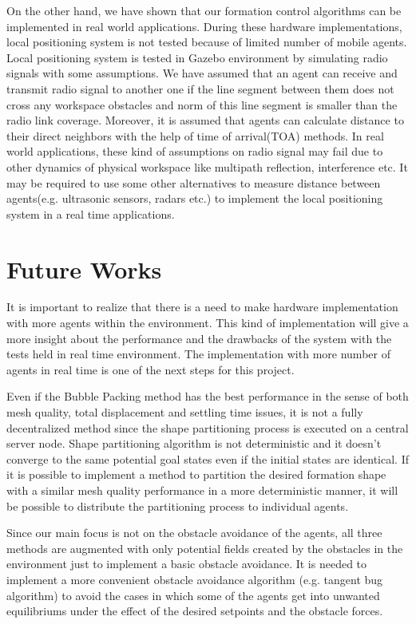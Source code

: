 On the other hand, we have shown that our formation control algorithms can be implemented in real world applications. During these hardware implementations, local positioning system is not tested because of limited number of mobile agents. Local positioning system is tested in Gazebo environment by simulating radio signals with some assumptions. We have assumed that an agent can receive and transmit radio signal to another one if the line segment between them does not cross any workspace obstacles and norm of this line segment is smaller than the radio link coverage. Moreover, it is assumed that agents can calculate distance to their direct neighbors with the help of time of arrival(TOA) methods. In real world applications, these kind of assumptions on radio signal may fail due to other dynamics of physical workspace like multipath reflection, interference etc. It may be required to use some other alternatives to measure distance between agents(e.g. ultrasonic sensors, radars etc.) to implement the local positioning system in a real time applications.

\section{Future Works}
It is important to realize that there is a need to make hardware implementation with more agents within the environment. This kind of  implementation will give a more insight about the performance and the drawbacks of the system with the tests held in real time environment. The implementation with more number of agents in real time is one of the next steps for this project.
		
Even if the Bubble Packing method has the best performance in the sense of both mesh quality, total displacement and settling time issues, it is not a fully decentralized method since the shape partitioning process is executed on a central server node. Shape partitioning algorithm is not deterministic and it doesn't converge to the same potential goal states even if the initial states are identical. If it is possible to implement a method to partition the desired formation shape with a similar mesh quality performance in a more deterministic manner, it will be possible to distribute the partitioning process to individual agents. 
    
Since our main focus is not on the obstacle avoidance of the agents, all three methods are augmented with only potential fields created by the obstacles in the environment just to implement a basic obstacle avoidance. It is needed to implement a more convenient obstacle avoidance algorithm (e.g. tangent bug algorithm) to avoid the cases in which some of the agents get into unwanted equilibriums under the effect of the desired setpoints and the obstacle forces.
    
